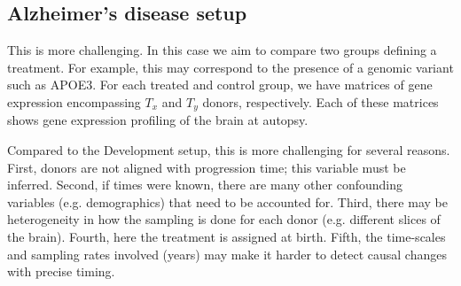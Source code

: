 \documentclass{article}
\begin{document}
\subsection{Alzheimer's disease setup}
This is more challenging. In this case we aim to compare two groups defining a treatment. For example, this may correspond to the presence of a genomic variant such as APOE3. For each treated and control group, we have matrices of gene expression encompassing $ T_x$ and $ T_y$ donors, respectively. Each of these matrices shows gene expression profiling of the brain at autopsy. 

Compared to the Development setup, this is more challenging for several reasons. First, donors are not aligned with progression time; this variable must be inferred. Second, if times were known, there are many other confounding variables (e.g. demographics) that need to be accounted for. Third, there may be heterogeneity in how the sampling is done for each donor (e.g. different slices of the brain). Fourth, here the treatment is assigned at birth. Fifth, the time-scales and sampling rates involved (years) may make it harder to detect causal changes with precise timing.
{}
\end{document}
